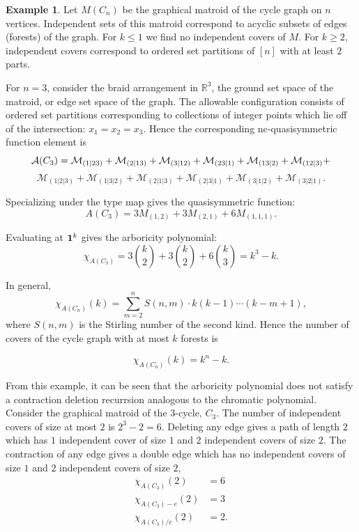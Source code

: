 \documentclass[12pt,reqno]{amsart}
\numberwithin{definition}{section}
\theoremstyle{definition}
\newtheorem{example}[definition]{Example}
\newcommand{\ncM}{\mathcal{M}}
\begin{document}
\begin{example}

Let $M(C_n)$ be the graphical matroid of the cycle graph on $n$
vertices.  Independent sets of this matroid correspond to acyclic
subsets of edges (forests) of the graph.  For $k \leq 1$ we find no
independent covers of $M$.  For $k \geq 2$, independent covers
correspond to ordered set partitions of $[n]$ with at least $2$ parts.


For $n=3$,  consider the braid arrangement in $\mathbb{R}^3$, the ground set space of the
matroid, or edge set space of the graph.  The allowable configuration consists of ordered set partitions
corresponding to collections of integer points which lie off of the
intersection: $x_1 = x_2 = x_3$. Hence the corresponding nc-quasisymmetric function element is 
$${\bf{{\mathcal A}}}(C_3) = \ncM_{(1|23)} + \ncM_{(2|13)} + \ncM_{(3|12)} + \ncM_{(23|1)} + \ncM_{(13|2)} +  \ncM_{(12|3)} + $$ $$ \ncM_{(1|2|3)} + \ncM_{(1|3|2)}
+ \ncM_{(2|1|3)} + \ncM_{(2|3|1)} + \ncM_{(3|1|2)} + \ncM_{(3|2|1)}. $$

\noindent Specializing under the type map gives the quasisymmetric function:
$${ A}(C_3) = 3 M_{(1,2)} + 3 M_{(2,1)} + 6 M_{(1,1,1)}. $$

\noindent Evaluating at ${\bf 1}^k $ gives the arboricity polynomial:
$$ \chi_{A(C_3)} = 3 { k \choose 2} + 3 { k \choose 2} + 6 { k \choose 3} = k^3 - k. $$

In general,
$$\chi_{A(C_n)}(k) = \sum_{m=2}^{n} S(n,m) \cdot k(k-1) \cdots (k-m+1), $$
where $S(n,m)$ is the Stirling number of the second kind. 
Hence the number of covers of the cycle graph with at most $k$ forests is

$$\chi_{A(C_n)}(k) = k^n - k. $$

\end{example}

From this example, it can be seen that the arboricity polynomial does
not satisfy a contraction deletion recurrsion analogous to the chromatic polynomial.  Consider the graphical matroid of the $3$-cycle, $C_3$.  The number of independent covers of size at most $2$ is $2^3-2 = 6$.    Deleting any edge gives a path of length $2$ which has $1$ independent cover of size $1$ and $2$ independent covers of size $2$.  The contraction of any edge gives a double edge which has no independent covers of size $1$ and $2$ independent covers of size $2$,  
\begin{align*}
\chi_{A(C_3)}(2) &= 6 \\
\chi_{A(C_3)-e}(2) &= 3 \\
\chi_{A(C_3) / e }(2)  &= 2.
\end{align*}
\end{document}
